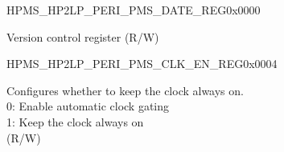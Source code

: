 \begin{register}{H}{PMS\_HP2LP\_PERI\_PMS\_DATE\_REG}{0x0000}\label{regdesc:PMSHP2LPPERIPMSDATEREG}
%
\regnewline%
\begin{regdesc}\begin{reglist}
\label{fielddesc:PMSHP2LPPERIPMSDATE}\item [PMS\_HP2LP\_PERI\_PMS\_DATE] Version control register (R/W)
\end{reglist}\end{regdesc}
\end{register}


\begin{register}{H}{PMS\_HP2LP\_PERI\_PMS\_CLK\_EN\_REG}{0x0004}\label{regdesc:PMSHP2LPPERIPMSCLKENREG}
%
%
\regnewline%
\begin{regdesc}\begin{reglist}
\label{fielddesc:PMSHP2LPPERIPMSCLKEN}\item [PMS\_HP2LP\_PERI\_PMS\_CLK\_EN] Configures whether to keep the clock always on.\\
0: Enable automatic clock gating \\
1: Keep the clock always on\\ (R/W)
\end{reglist}\end{regdesc}
\end{register}



